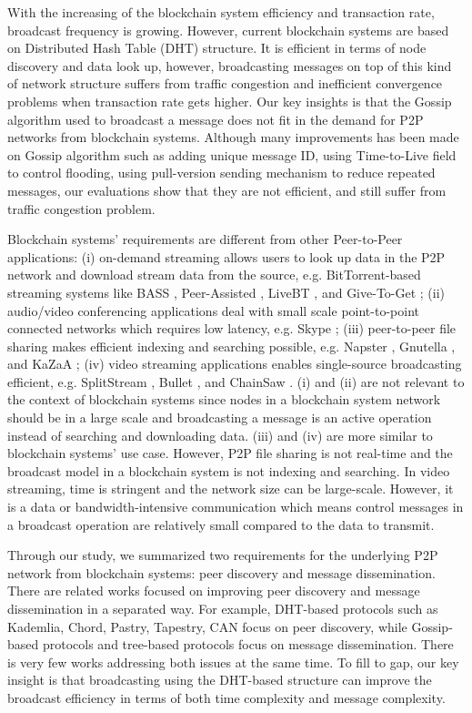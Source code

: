With the increasing of the blockchain system efficiency and transaction rate, broadcast frequency is growing. However, current blockchain systems are based on Distributed Hash Table (DHT) structure. It is efficient in terms of node discovery and data look up, however, broadcasting messages on top of this kind of network structure suffers from traffic congestion and inefficient convergence problems when transaction rate gets higher. Our key insights is that the Gossip algorithm used to broadcast a message does not fit in the demand for P2P networks from blockchain systems. Although many improvements has been made on Gossip algorithm such as adding unique message ID, using Time-to-Live field to control flooding, using pull-version sending mechanism to reduce repeated messages, our evaluations show that they are not efficient, and still suffer from traffic congestion problem. 

Blockchain systems' requirements are different from other Peer-to-Peer applications: (i) on-demand streaming allows users to look up data in the P2P network and download stream data from the source, e.g. BitTorrent-based streaming systems like BASS \cite{dana2005bass}, Peer-Assisted \cite{carlsson2007peer}, LiveBT \cite{lv2007livebt}, and Give-To-Get \cite{mol2008give}; (ii) audio/video conferencing applications deal with small scale point-to-point connected networks which requires low latency, e.g. Skype \cite{baset2004analysis}; (iii) peer-to-peer file sharing makes efficient indexing and searching possible, e.g. Napster \cite{saroiu2003measuring}, Gnutella \cite{ripeanu2001peer}, and KaZaA \cite{good2003usability}; (iv) video streaming applications enables single-source broadcasting efficient, e.g. SplitStream \cite{castro2003splitstream}, Bullet \cite{kostic2003bullet}, and ChainSaw \cite{pai2005chainsaw}. (i) and (ii) are not relevant to the context of blockchain systems since nodes in a blockchain system network should be in a large scale and broadcasting a message is an active operation instead of searching and downloading data. (iii) and (iv) are more similar to blockchain systems' use case. However, P2P file sharing is not real-time and the broadcast model in a blockchain system is not indexing and searching. In video streaming, time is stringent and the network size can be large-scale. However, it is a data or bandwidth-intensive communication which means control messages in a broadcast operation are relatively small compared to the data to transmit.

Through our study, we summarized two requirements for the underlying P2P network from blockchain systems: peer discovery and message dissemination. There are related works focused on improving peer discovery and message dissemination in a separated way. For example, DHT-based protocols such as Kademlia, Chord, Pastry, Tapestry, CAN focus on peer discovery, while Gossip-based protocols and tree-based protocols focus on message dissemination. There is very few works addressing both issues at the same time. To fill to gap, our key insight is that broadcasting using the DHT-based structure can improve the broadcast efficiency in terms of both time complexity and message complexity.

